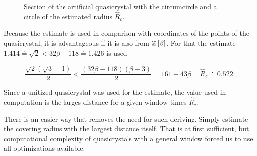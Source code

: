 \documentclass[text.tex]{subfiles}
\begin{document}
\begin{figure}[h]
\centering
{}
\caption{Section of the artificial quasicrystal with the circumcircle and a circle of the estimated radius $\hat{R}_c$.}
\label{fig:coveringRadius}
\end{figure}

Because the estimate is used in comparison with coordinates of the points of the quasicrystal, it is advantageous if it is also from $\mathbb{Z}\left[\beta\right]$. For that the estimate $1.414 \doteq \sqrt{2} <32\beta-118 \doteq 1.426$ is used.

$$\frac{\sqrt{2}(\sqrt{3}-1)}{2} < \frac{(32\beta-118)(\beta-3)}{2} = 161-43\beta = \hat{R}_c \doteq 0.522$$

Since a unitized quasicrystal was used for the estimate, the value used in computation is the larges distance for a given window times $\hat{R}_c$.

\begin{remark}
There is an easier way that removes the need for such deriving. Simply estimate the covering radius with the largest distance itself. That is at first sufficient, but computational complexity of quasicrystals with a general window forced us to use all optimizations available.
\end{remark}
\end{document}
